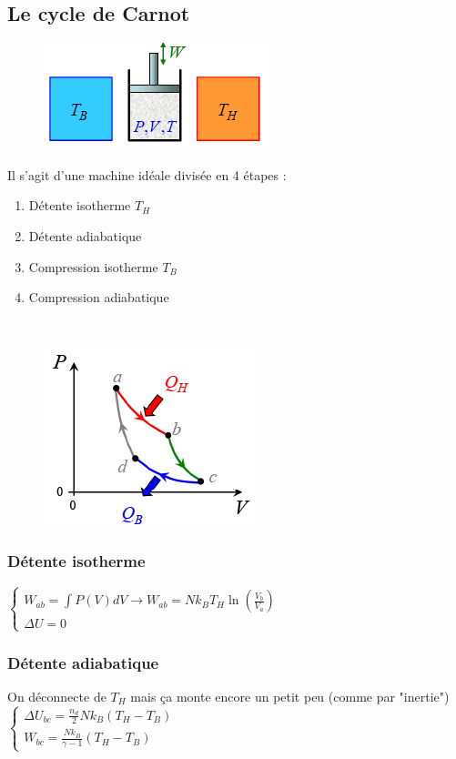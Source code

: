 \documentclass	[11pt, a4paper, openany]{book}
\begin{document}
\subsection{Le cycle de Carnot}
\begin{figure}
\includegraphics[scale=0.64]{th/image16.png}
\end{figure}
Il s'agit d'une machine idéale divisée en 4 étapes :
\begin{enumerate}
\item Détente isotherme $T_H$
\item Détente adiabatique
\item Compression isotherme $T_B$
\item Compression adiabatique
\end{enumerate}
\ \\
\begin{figure}
\includegraphics[scale=0.54]{th/image17.png}
\end{figure}
\subsubsection{Détente isotherme}
$\left\{\begin{array}{l}
W_{ab} = \int P(V)dV \rightarrow W_{ab} = Nk_BT_H\ln\left(\frac{V_b}{V_a}\right)\\
\Delta U = 0
\end{array}\right.$

\subsubsection{Détente adiabatique}
On déconnecte de $T_H$ mais ça monte encore un petit peu (comme par "inertie")\\
$\left\{\begin{array}{l}
\Delta U_{bc} = \frac{n_d}{2}Nk_B(T_H-T_B)\\
W_{bc} = \frac{Nk_B}{\gamma - 1}(T_H - T_B)
\end{array}\right.$
\end{document}
